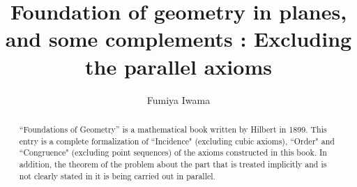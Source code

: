 \documentclass[11pt,a4paper]{article}
\begin{document}
\title{\bf Foundation of geometry in planes, and some complements : Excluding the parallel axioms}
\author{Fumiya Iwama}
\maketitle

\begin{abstract}
``Foundations of Geometry'' is a mathematical book written by Hilbert in 1899.
This entry is a complete formalization of ``Incidence" (excluding cubic axioms), ``Order" and ``Congruence" (excluding point sequences) of the axioms constructed in this book. 
In addition, the theorem of the problem about the part that is treated implicitly and is not clearly stated in it is being carried out in parallel.
\end{abstract}

\tableofcontents





\end{document}

